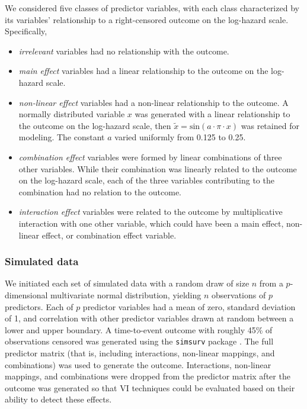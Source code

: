 \documentclass[twoside,11pt]{article}\usepackage[]{graphicx}\usepackage[]{xcolor}
\newcommand{\ie}{that is}
\begin{document}
We considered five classes of predictor variables, with each class characterized by its variables' relationship to a right-censored outcome on the log-hazard scale. Specifically, \begin{itemize}
\item \textit{irrelevant} variables had no relationship with the outcome.
\item \textit{main effect} variables had a linear relationship to the outcome on the log-hazard scale.
\item \textit{non-linear effect} variables had a non-linear relationship to the outcome. A normally distributed variable $x$ was generated with a linear relationship to the outcome on the log-hazard scale, then $\tilde{x} = \text{sin}(a \cdot \pi \cdot x)$ was retained for modeling. The constant $a$ varied uniformly from 0.125 to 0.25.
\item \textit{combination effect} variables were formed by linear combinations of three other variables. While their combination was linearly related to the outcome on the log-hazard scale, each of the three variables contributing to the combination had no relation to the outcome.
\item \textit{interaction effect} variables were related to the outcome by multiplicative interaction with one other variable, which could have been a main effect, non-linear effect, or combination effect variable.
\end{itemize}

\subsubsection{Simulated data} \label{sec:data_sim}

We initiated each set of simulated data with a random draw of size $n$ from a $p$-dimensional multivariate normal distribution, yielding $n$ observations of $p$ predictors. Each of $p$ predictor variables had a mean of zero, standard deviation of 1, and correlation with other predictor variables drawn at random between a lower and upper boundary. A time-to-event outcome with roughly 45\% of observations censored was generated using the \texttt{simsurv} package \citep{simsurv, simsurv_paper}. The full predictor matrix (\ie, including interactions, non-linear mappings, and combinations) was used to generate the outcome. Interactions, non-linear mappings, and combinations were dropped from the predictor matrix after the outcome was generated so that VI techniques could be evaluated based on their ability to detect these effects.
\end{document}
